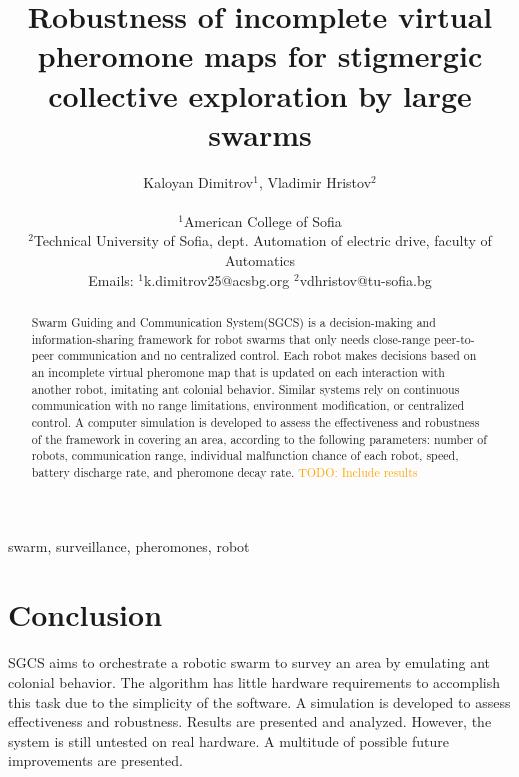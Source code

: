 \documentclass[a4paper, 11pt]{article}
\title{Robustness of incomplete virtual pheromone maps for stigmergic collective exploration by large swarms}
\author{
Kaloyan Dimitrov$^{1}$, Vladimir Hristov$^{2}$\\
\begin{footnotesize}
$^{1}$American College of Sofia\\
$^{2}$Technical University of Sofia, dept. Automation of electric drive, faculty of Automatics\\
Emails: $^{1}$k.dimitrov25@acsbg.org $^{2}$vdhristov@tu-sofia.bg
\end{footnotesize}
}
\date{}
\makeatletter
\newcommand{\todo}[1]{\textcolor{orange}{TODO: #1}}
\renewcommand{\maketitle}{\bgroup\setlength{\parindent}{0pt}
\begin{flushleft}
  \Large\@title \par
  \large \textit{\@author}
\end{flushleft}\egroup
}
\makeatother
\begin{document}
\maketitle
\begin{abstract}
Swarm Guiding and Communication System(SGCS) is a decision-making and information-sharing framework for robot swarms that only needs close-range peer-to-peer communication and no centralized control. Each robot makes decisions based on an incomplete virtual pheromone map that is updated on each interaction with another robot, imitating ant colonial behavior. Similar systems rely on continuous communication with no range limitations, environment modification, or centralized control. A computer simulation is developed to assess the effectiveness and robustness of the framework in covering an area, according to the following parameters: number of robots, communication range, individual malfunction chance of each robot, speed, battery discharge rate, and pheromone decay rate. \todo{Include results}
\end{abstract}
\begin{keywords}
swarm, surveillance, pheromones, robot
\end{keywords}







\section{Conclusion}
SGCS aims to orchestrate a robotic swarm to survey an area by emulating ant colonial behavior. The algorithm has little hardware requirements to accomplish this task due to the simplicity of the software. A simulation is developed to assess effectiveness and robustness. Results are presented and analyzed. However, the system is still untested on real hardware. A multitude of possible future improvements are presented. 
\printbibliography
\end{document}
